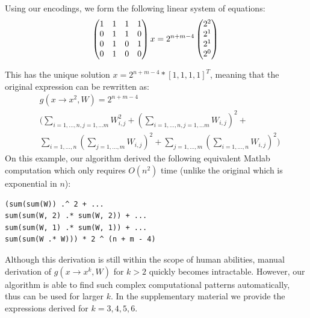 Using our encodings, we form the following linear system of equations:
 \begin{equation}
 \begin{pmatrix} 
  1 & 1 & 1 & 1 \\ 
  0 & 1 & 1 & 0 \\ 
  0 & 1 & 0 & 1 \\ 
  0 & 1 & 0 & 0 \\     
\end{pmatrix}x = 2^{n + m - 4}\begin{pmatrix} 
  2^{2}\\ 
  2^{1}\\ 
  2^{1}\\ 
  2^{0}\\     
\end{pmatrix} \\
 \end{equation}

 This has the unique solution $x=2^{n + m - 4} * [1, 1, 1, 1]^T$, meaning that the original expression can be
rewritten as: 
\begin{align*}
	&g(x \rightarrow x^2, W) = 2^{n + m - 4} \\ 
 &\Big(\sum_{i = 1, \dots, n, j = 1, \dots m} W_{i, j}^2 + (\sum_{i = 1, \dots, n, j = 1, \dots m} W_{i, j})^2 + \\
 &\sum_{i = 1, \dots, n}(\sum_{j = 1, \dots, m} W_{i, j})^2 + \sum_{j = 1, \dots, m}(\sum_{i = 1, \dots, n} W_{i, j})^2 \Big)
\end{align*}
On this example, our algorithm derived the following equivalent Matlab
computation which only requires $O(n^2)$ time (unlike the original
which is exponential in $n$):
\begin{lstlisting}
(sum(sum(W)) .^ 2 + ...
sum(sum(W, 2) .* sum(W, 2)) + ... 
sum(sum(W, 1) .* sum(W, 1)) + ... 
sum(sum(W .* W))) * 2 ^ (n + m - 4)
\end{lstlisting}

Although this derivation is still within the scope of human abilities, manual derivation
of $g(x \rightarrow x^k, W)$ for $k > 2$ quickly becomes
intractable. However, our algorithm is able to find such complex
computational patterns automatically, thus can be used for larger
$k$. In the supplementary material we provide the expressions derived
for $k=3,4,5,6$.  

